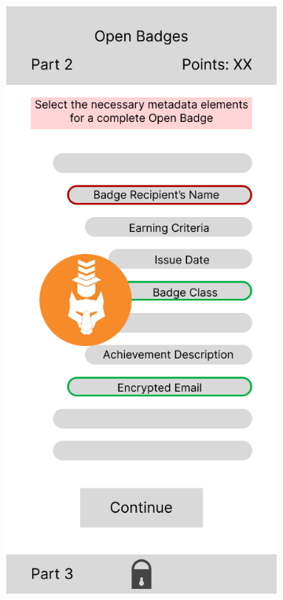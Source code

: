 \begin{figure}[H]
  \centering
  \begin{subfigure}[]{0.3\textwidth}
    \includegraphics[width=\textwidth]{Media/design1.png}

\end{subfigure}
\end{figure}
